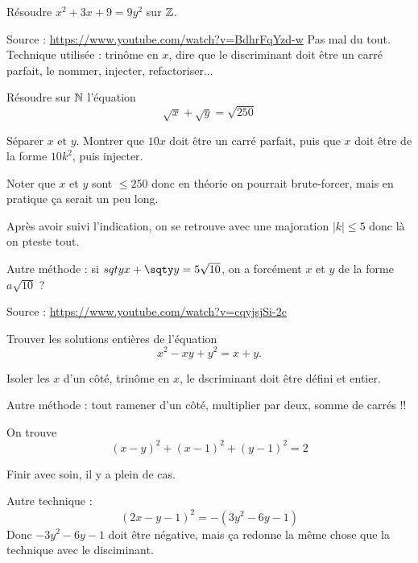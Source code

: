 \begin{exo}
Résoudre $x^2+3x+9=9y^2$ sur $\mathbb Z$.
\begin{hint}
\end{hint}
\begin{sol}
Source : \url{https://www.youtube.com/watch?v=BdhrFqYzd-w}
Pas mal du tout. Technique utilisée : trinôme en $x$, dire que le discriminant doit être un carré parfait, le nommer, injecter, refactoriser...
\end{sol}
\end{exo}



\begin{exo}
Résoudre sur $\mathbb N$ l'équation 
\[ \sqrt x + \sqrt y = \sqrt{250}\]
\begin{hint}
Séparer $x$ et $y$. Montrer que $10x$ doit être un carré parfait, puis que $x$ doit être de la forme $10k^2$, puis injecter.
\end{hint}
\begin{sol}
Noter que $x$ et $y$ sont $\leq 250$ donc en théorie on pourrait \og brute-forcer\fg, mais en pratique ça serait un peu long.

Après avoir suivi l'indication, on se retrouve avec une majoration $|k|\leq 5$ donc là on pteste tout.

Autre méthode : si $sqty x + \sqty y = 5\sqrt{10}$, on a forcément $x$ et $y$ de la forme $a\sqrt{10}$ ? 


Source : \url{https://www.youtube.com/watch?v=cqyjsjSi-2c}
\end{sol}
\end{exo}

\begin{exo}
Trouver les solutions entières de l'équation
\[ x^2-xy+y^2 = x+y.\]
\begin{hint}
\end{hint}
\begin{sol}
Isoler les $x$ d'un côté, trinôme en $x$, le dscriminant doit être défini et entier.

Autre méthode : tout ramener d'un côté, multiplier par deux, somme de carrés !!

On trouve
\[ (x-y)^2 + (x-1)^2+(y-1)^2=2\]

Finir avec soin, il y a plein de cas.

Autre technique :
\[ (2x - y  - 1)^2 = -(3y^2 - 6y - 1)\]
Donc $-3y^2-6y-1$ doit être négative, mais ça redonne la même chose que la technique avec le disciminant.
\end{sol}
\end{exo}

